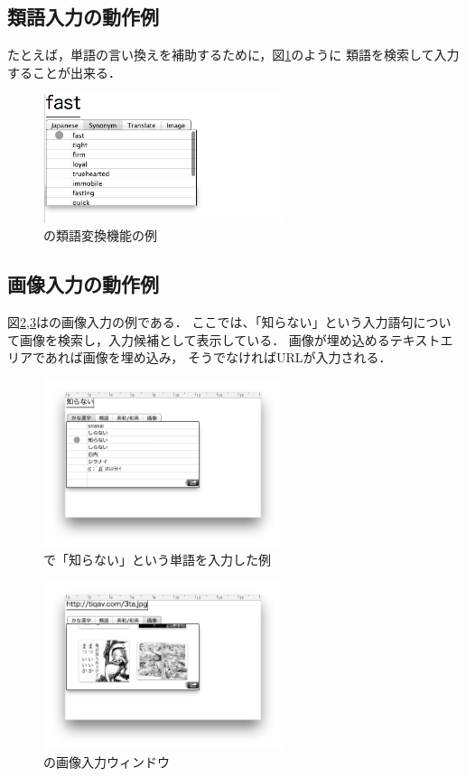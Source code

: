 \subsection{類語入力の動作例}
たとえば，単語の言い換えを補助するために，図\ref{synonym}のように
類語を検索して入力することが出来る．

\begin{figure}[H]
\centerline{\includegraphics[width=70mm,bb=0 0 350 250]{figures/synonym.png}}
\caption{{\system}の類語変換機能の例}
\label{synonym}
\end{figure}

\subsection{画像入力の動作例}
図\ref{image1},\ref{image2}は{\system}の画像入力の例である．
ここでは、「知らない」という入力語句について画像を検索し，入力候補として表示している．
画像が埋め込めるテキストエリアであれば画像を埋め込み，
そうでなければURLが入力される．

\begin{figure}[H]
\centerline{\includegraphics[width=70mm,bb=0 0 600 400]{figures/image1.png}}
\caption{{\system}で「知らない」という単語を入力した例}
\label{image1}
\end{figure}

\begin{figure}[H]
\centerline{\includegraphics[width=70mm,bb=0 0 600 400]{figures/image2.png}}
\caption{{\system}の画像入力ウィンドウ}
\label{image2}
\end{figure}

